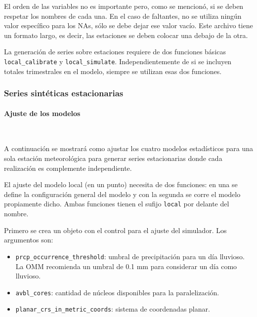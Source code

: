 \documentclass[
  12pt]{article}
\providecommand{\tightlist}{%
  \setlength{\itemsep}{0pt}\setlength{\parskip}{0pt}}
\begin{document}
El orden de las variables no es importante pero, como se mencionó, si se deben respetar los nombres de cada una. En el caso de faltantes, no se utiliza ningún valor específico para los NAs, sólo se debe dejar ese valor vacío.
Este archivo tiene un formato largo, es decir, las estaciones se deben colocar una debajo de la otra.

La generación de series sobre estaciones requiere de dos funciones básicas \texttt{local\_calibrate} y \texttt{local\_simulate}. Independientemente de si se incluyen totales trimestrales en el modelo, siempre se utilizan esas dos funciones.

\hypertarget{series-sintuxe9ticas-estacionarias}{%
\subsubsection{Series sintéticas estacionarias}\label{series-sintuxe9ticas-estacionarias}}

\hypertarget{ajuste-de-los-modelos}{%
\paragraph{Ajuste de los modelos}\label{ajuste-de-los-modelos}}

~

A continuación se mostrará como ajustar los cuatro modelos estadísticos para una sola estación meteorológica para generar series estacionarias donde cada realización es complemente independiente.

El ajuste del modelo local (en un punto) necesita de dos funciones: en una se define la configuración general del modelo y con la segunda se corre el modelo propiamente dicho. Ambas funciones tienen el sufijo \texttt{local} por delante del nombre.

Primero se crea un objeto con el control para el ajuste del simulador. Los argumentos son:

\begin{itemize}
\tightlist
\item
  \texttt{prcp\_occurrence\_threshold}: umbral de precipitación para un día lluvioso. La OMM recomienda un umbral de 0.1 mm para considerar un día como lluvioso.
\item
  \texttt{avbl\_cores}: cantidad de núcleos disponibles para la paralelización.
\item
  \texttt{planar\_crs\_in\_metric\_coords}: sistema de coordenadas planar.
\end{itemize}
\end{document}
